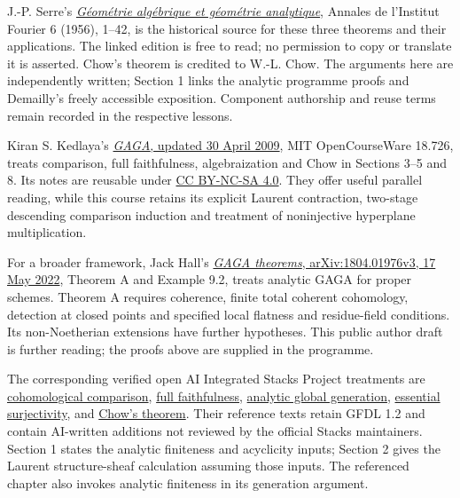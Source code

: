 \documentclass[11pt]{article}
\begin{document}
J.-P. Serre's
\href{https://www.numdam.org/item/AIF_1956__6__1_0/}{\emph{Géométrie
algébrique et géométrie analytique}}, Annales de l'Institut Fourier 6
(1956), 1--42, is the historical source for these three theorems and
their applications. The linked edition is free to read; no permission to
copy or translate it is asserted. Chow's theorem is credited to W.-L.
Chow. The arguments here are independently written; Section 1 links the
analytic programme proofs and Demailly's freely accessible exposition.
Component authorship and reuse terms remain recorded in the respective
lessons.

Kiran S. Kedlaya's
\href{https://ocw.mit.edu/courses/18-726-algebraic-geometry-spring-2009/resources/mit18_726s09_lec22_gaga/}{\emph{GAGA},
updated 30 April 2009}, MIT OpenCourseWare 18.726, treats comparison,
full faithfulness, algebraization and Chow in Sections 3--5 and 8. Its
notes are reusable under
\href{https://ocw.mit.edu/pages/privacy-and-terms-of-use/}{CC BY-NC-SA
4.0}. They offer useful parallel reading, while this course retains its
explicit Laurent contraction, two-stage descending comparison induction
and treatment of noninjective hyperplane multiplication.

For a broader framework, Jack Hall's
\href{https://arxiv.org/abs/1804.01976v3}{\emph{GAGA theorems},
arXiv:1804.01976v3, 17 May 2022}, Theorem A and Example 9.2, treats
analytic GAGA for proper schemes. Theorem A requires coherence, finite
total coherent cohomology, detection at closed points and specified
local flatness and residue-field conditions. Its non-Noetherian
extensions have further hypotheses. This public author draft is further
reading; the proofs above are supplied in the programme.

The corresponding verified open AI Integrated Stacks Project treatments
are
\href{https://kokunoyumeto.github.io/stacks-zh-hans-cn/en/gaga.html\#gaga-section-proof-gaga-cohomology}{cohomological
comparison},
\href{https://kokunoyumeto.github.io/stacks-zh-hans-cn/en/gaga.html\#gaga-section-proof-gaga-fully-faithful}{full
faithfulness},
\href{https://kokunoyumeto.github.io/stacks-zh-hans-cn/en/gaga.html\#gaga-lemma-projective-analytic-global-generation}{analytic
global generation},
\href{https://kokunoyumeto.github.io/stacks-zh-hans-cn/en/gaga.html\#gaga-section-completion-gaga-essential-surjectivity}{essential
surjectivity}, and
\href{https://kokunoyumeto.github.io/stacks-zh-hans-cn/en/gaga.html\#gaga-theorem-chow-closed-analytic-projective}{Chow's
theorem}. Their reference texts retain GFDL 1.2 and contain AI-written
additions not reviewed by the official Stacks maintainers. Section 1
states the analytic finiteness and acyclicity inputs; Section 2 gives
the Laurent structure-sheaf calculation assuming those inputs. The
referenced chapter also invokes analytic finiteness in its generation
argument.
\end{document}
